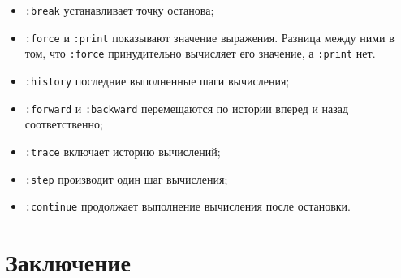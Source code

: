 \documentclass[14pt]{extarticle}
\def\code#1{\texttt{#1}}
\begin{document}
\begin{itemize}
\item \code{:break} устанавливает точку останова;
\item \code{:force} и \code{:print} показывают значение выражения. Разница между ними в
том, что \code{:force} принудительно вычисляет его значение, а \code{:print} нет.
\item \code{:history} последние выполненные шаги вычисления;
\item \code{:forward} и \code{:backward} перемещаются по истории вперед и назад
соответственно;
\item \code{:trace} включает историю вычислений;
\item \code{:step} производит один шаг вычисления;
\item \code{:continue} продолжает выполнение вычисления после остановки.
\end{itemize}

\section{Заключение}
\end{document}
